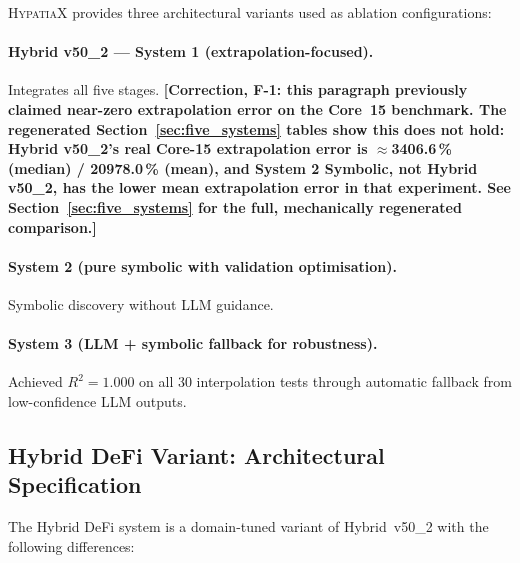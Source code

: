 \documentclass[twoside,11pt]{article}
\begin{document}
\textsc{HypatiaX} provides three architectural variants used as ablation
configurations:

\paragraph{Hybrid v50\_2 --- System 1 (extrapolation-focused).}
Integrates all five stages. \textbf{[Correction, F-1: this paragraph
previously claimed near-zero extrapolation error on the Core~15
benchmark. The regenerated Section~\ref{sec:five_systems} tables show
this does not hold: Hybrid v50\_2's real Core-15 extrapolation error is
$\approx$3406.6\,\% (median) / 20978.0\,\% (mean), and System 2 Symbolic,
not Hybrid v50\_2, has the lower mean extrapolation error in that
experiment. See Section~\ref{sec:five_systems} for the full,
mechanically regenerated comparison.]}

\paragraph{System 2 (pure symbolic with validation optimisation).}
Symbolic discovery without LLM guidance.

\paragraph{System 3 (LLM + symbolic fallback for robustness).}
Achieved $R^2 = 1.000$ on all 30 interpolation tests through automatic
fallback from low-confidence LLM outputs.

\subsection{Hybrid DeFi Variant: Architectural Specification}\label{subsec:hybrid-defi-variant-architectural-specif}
\label{sec:hybrid_defi_spec}

The Hybrid DeFi system is a domain-tuned variant of Hybrid~v50\_2 with the
following differences:
\end{document}
